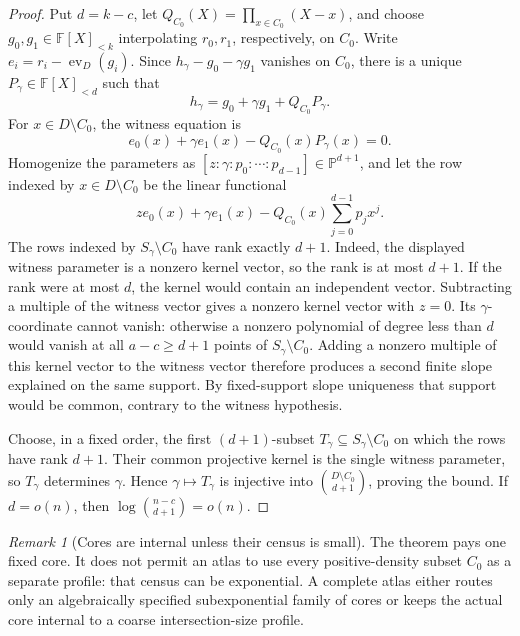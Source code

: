 \documentclass[11pt,a4paper]{amsart}
\numberwithin{equation}{section}
\theoremstyle{remark}
\newtheorem{remark}[remark]{Remark}
\newcommand{\F}{\mathbb F}
\newcommand{\Pj}{\mathbb P}
\begin{document}
\begin{proof}
Put \(d=k-c\), let
\(Q_{C_0}(X)=\prod_{x\in C_0}(X-x)\), and choose
\(g_0,g_1\in\F[X]_{<k}\) interpolating \(r_0,r_1\), respectively, on
\(C_0\).  Write \(e_i=r_i-\operatorname{ev}_D(g_i)\).  Since
\(h_\gamma-g_0-\gamma g_1\) vanishes on \(C_0\), there is a unique
\(P_\gamma\in\F[X]_{<d}\) such that
\[
 h_\gamma=g_0+\gamma g_1+Q_{C_0}P_\gamma .
\]
For \(x\in D\setminus C_0\), the witness equation is
\[
 e_0(x)+\gamma e_1(x)-Q_{C_0}(x)P_\gamma(x)=0.     \tag{*}
\]
Homogenize the parameters as
\([z:\gamma:p_0:\cdots:p_{d-1}]\in\Pj^{d+1}\), and let the row
indexed by \(x\in D\setminus C_0\) be the linear functional
\[
 z e_0(x)+\gamma e_1(x)
   -Q_{C_0}(x)\sum_{j=0}^{d-1}p_jx^j.
\]
The rows indexed by \(S_\gamma\setminus C_0\) have rank exactly
\(d+1\).  Indeed, the displayed witness parameter is a nonzero kernel
vector, so the rank is at most \(d+1\).  If the rank were at most \(d\),
the kernel would contain an independent vector.  Subtracting a multiple
of the witness vector gives a nonzero kernel vector with \(z=0\).  Its
\(\gamma\)-coordinate cannot vanish: otherwise a nonzero polynomial of
degree less than \(d\) would vanish at all
\(a-c\ge d+1\) points of \(S_\gamma\setminus C_0\).  Adding a nonzero
multiple of this kernel vector to the witness vector therefore produces a
second finite slope explained on the same support.  By fixed-support slope
uniqueness that support would be common, contrary to the witness
hypothesis.

Choose, in a fixed order, the first \((d+1)\)-subset
\(T_\gamma\subseteq S_\gamma\setminus C_0\) on which the rows have rank
\(d+1\).  Their common projective kernel is the single witness parameter,
so \(T_\gamma\) determines \(\gamma\).  Hence
\(\gamma\mapsto T_\gamma\) is injective into
\(\binom{D\setminus C_0}{d+1}\), proving the bound.  If
\(d=o(n)\), then
\(\log\binom{n-c}{d+1}=o(n)\).
\end{proof}

\begin{remark}[Cores are internal unless their census is small]
The theorem pays one fixed core.  It does not permit an atlas to use every
positive-density subset \(C_0\) as a separate profile: that census can be
exponential.  A complete atlas either routes only an algebraically
specified subexponential family of cores or keeps the actual core internal
to a coarse intersection-size profile.
\end{remark}
\end{document}
